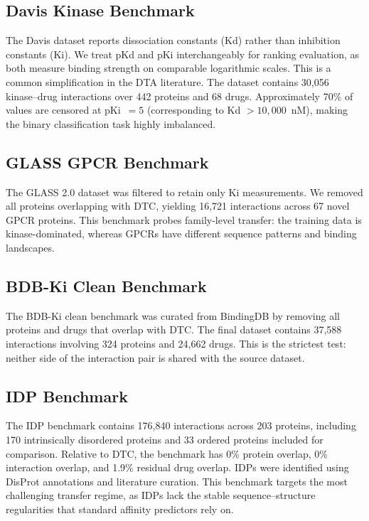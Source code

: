 \documentclass[11pt]{article}
\begin{document}
\subsection{Davis Kinase Benchmark}

The Davis dataset reports dissociation constants (Kd) rather than inhibition constants (Ki). We treat pKd and pKi interchangeably for ranking evaluation, as both measure binding strength on comparable logarithmic scales. This is a common simplification in the DTA literature. The dataset contains 30,056 kinase--drug interactions over 442 proteins and 68 drugs. Approximately 70\% of values are censored at pKi~$= 5$ (corresponding to Kd $> 10{,}000$~nM), making the binary classification task highly imbalanced.

\subsection{GLASS GPCR Benchmark}

The GLASS 2.0 dataset was filtered to retain only Ki measurements. We removed all proteins overlapping with DTC, yielding 16,721 interactions across 67 novel GPCR proteins. This benchmark probes family-level transfer: the training data is kinase-dominated, whereas GPCRs have different sequence patterns and binding landscapes.

\subsection{BDB-Ki Clean Benchmark}

The BDB-Ki clean benchmark was curated from BindingDB by removing all proteins and drugs that overlap with DTC. The final dataset contains 37,588 interactions involving 324 proteins and 24,662 drugs. This is the strictest test: neither side of the interaction pair is shared with the source dataset.

\subsection{IDP Benchmark}

The IDP benchmark contains 176,840 interactions across 203 proteins, including 170 intrinsically disordered proteins and 33 ordered proteins included for comparison. Relative to DTC, the benchmark has 0\% protein overlap, 0\% interaction overlap, and 1.9\% residual drug overlap. IDPs were identified using DisProt annotations and literature curation. This benchmark targets the most challenging transfer regime, as IDPs lack the stable sequence--structure regularities that standard affinity predictors rely on.
\end{document}
